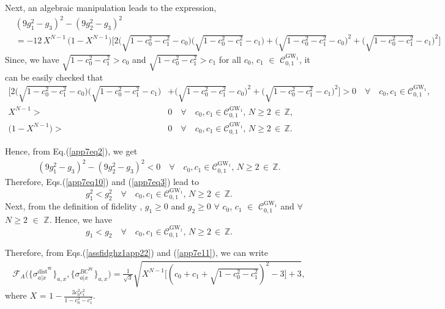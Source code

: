 \documentclass[reprint,superscriptaddress,nofootinbib,amsmath,amssymb,aps,pra,longbibliography]{revtex4-1}
\begin{document}
\begin{widetext}
 Next, an algebraic manipulation leads to the expression,
\begin{align}
&(9 g_1^2 - g_3)^2 - (9 g_2^2 - g_3)^2 \nonumber \\
&= - 12 \, X^{N-1} \, \Big(1-X^{N-1} \Big) \Bigg[2 \Big(\sqrt{1 - c_0^2 - c_1^2} - c_0 \Big) \Big(\sqrt{1 - c_0^2 - c_1^2} - c_1 \Big) + \Big(\sqrt{1 - c_0^2 - c_1^2} - c_0 \Big)^2 + \Big(\sqrt{1 - c_0^2 - c_1^2} - c_1 \Big)^2 \Bigg] 
\label{app7eq2}
\end{align}
Since, we have $\sqrt{1 - c_0^2 - c_1^2} > c_0$ and $\sqrt{1 - c_0^2 - c_1^2} > c_1$ for all $c_0$, $c_1$ $\in$ $\mathcal{C}^{\text{GW}_1}_{0,1}$, it can be easily checked that
\begin{align}
  \Bigg[2 \Big(\sqrt{1 - c_0^2 - c_1^2} - c_0 \Big) \Big(\sqrt{1 - c_0^2 - c_1^2} - c_1 \Big) &+ \Big(\sqrt{1 - c_0^2 - c_1^2} - c_0 \Big)^2 + \Big(\sqrt{1 - c_0^2 - c_1^2} - c_1 \Big)^2 \Bigg]    > 0 \quad \forall \quad c_0, c_1 \in \mathcal{C}^{\text{GW}_1}_{0,1}, \nonumber 
 \\
  X^{N-1} >& 0 \quad \forall \quad c_0, c_1 \in \mathcal{C}^{\text{GW}_1}_{0,1}, \, N \geq 2 \, \in \, \mathbb{Z}, \nonumber \\
 \Big(1-X^{N-1} \Big) >& 0 \quad \forall \quad c_0, c_1 \in \mathcal{C}^{\text{GW}_1}_{0,1}, \, N \geq 2 \, \in \, \mathbb{Z}.
\end{align}

Hence, from Eq.(\ref{app7eq2}), we get 
\begin{align}
(9 g_1^2 - g_3)^2 - (9 g_2^2 - g_3)^2 < 0 \quad \forall \quad c_0, c_1 \in \mathcal{C}^{\text{GW}_1}_{0,1}, \, N \geq 2 \, \in \, \mathbb{Z}.
\label{app7eq3}
\end{align}
Therefore, Eqs.(\ref{app7eq10}) and (\ref{app7eq3}) lead to 
\begin{equation}
   g_1^2 < g_2^2 \quad \forall \quad c_0, c_1 \in \mathcal{C}^{\text{GW}_1}_{0,1}, \, N \geq 2 \, \in \, \mathbb{Z}.
\end{equation}
Next, from  the definition of fidelity \cite{Nery20}, $g_1 \geq 0$ and $g_2 \geq 0$ $\forall$ $c_0$, $c_1$ $\in$ $\mathcal{C}^{\text{GW}_1}_{0,1}$ and $\forall$ $N \geq 2$ $\in$ $\mathbb{Z}$. Hence, we have
\begin{equation}
   g_1 < g_2 \quad \forall \quad c_0, c_1 \in \mathcal{C}^{\text{GW}_1}_{0,1}, \, N \geq 2 \, \in \, \mathbb{Z}.
   \label{app7e11}
\end{equation}

Therefore, from Eqs.(\ref{assfidghz1app22}) and (\ref{app7e11}), we can write
\begin{align}
    \mathcal{F}_{A} \Big( \{\sigma_{a|x}^{\text{dist}^{\text{W}}} \}_{a,x}, \{\sigma_{a|x}^{BC^{\text{W}}}\}_{a,x} \Big) = \frac{1}{\sqrt{3}} \sqrt{X^{N-1} \Big[ (c_0 + c_1 + \sqrt{1- c_0^2 - c_1^2})^2 -3 \Big] + 3},
     \label{assfinal7}
\end{align}
where $X$ = $1- \frac{3 c_0^2 c_1^2}{1- c_0^2-c_1^2}$.



\end{widetext}
\end{document}
